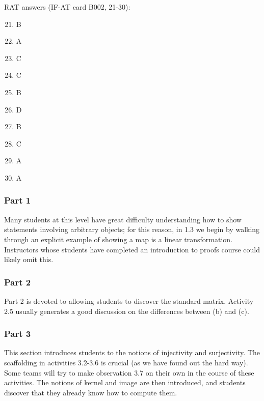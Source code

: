 \documentclass{article}
\begin{document}
RAT answers (IF-AT card B002, 21-30):
\begin{multicols}{10}
\begin{enumerate}[1)]
\setcounter{enumi}{20}
\item B
\item A
\item C
\item C
\item B
\item D
\item B
\item C
\item A
\item A
\end{enumerate}
\end{multicols}
\subsubsection*{Part 1}
Many students at this level have great difficulty understanding how to show statements involving arbitrary objects; for this reason, in 1.3 we begin by walking through an explicit example of showing a map is a linear transformation.  Instructors whose students have completed an introduction to proofs course could likely omit this.  

\subsubsection*{Part 2}
Part 2 is devoted to allowing students to discover the standard matrix.  Activity 2.5 usually generates a good discussion on the differences between (b) and (c).  

\subsubsection*{Part 3}
This section introduces students to the notions of injectivity and surjectivity.  The scaffolding in activities 3.2-3.6 is crucial (as we have found out the hard way).  Some teams will try to make observation 3.7 on their own in the course of these activities.  The notions of kernel and image are then introduced, and students discover that they already know how to compute them.
\end{document}
